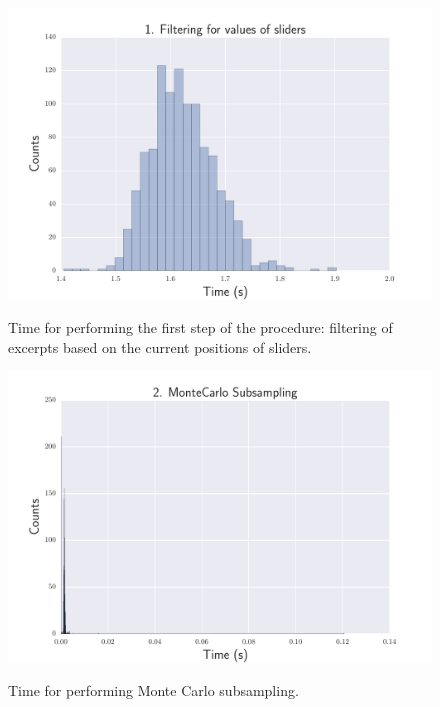 \begin{figure}[htbp]
\begin{center}
\includegraphics[scale=0.7]{Figures/bench_sliders.pdf}
  \caption[Time for filtering music in regards to sliders' positions]{Time for performing the first step of the procedure: filtering of excerpts based on the current positions of sliders.}
  \label{fig:step1}
\vspace{2cm}
\includegraphics[scale=0.7]{Figures/bench_subsampling.pdf}
  \caption[Time for performing Monte Carlo subsampling]{Time for performing Monte Carlo subsampling.}
  \label{fig:step2}
\end{center}
\end{figure}

